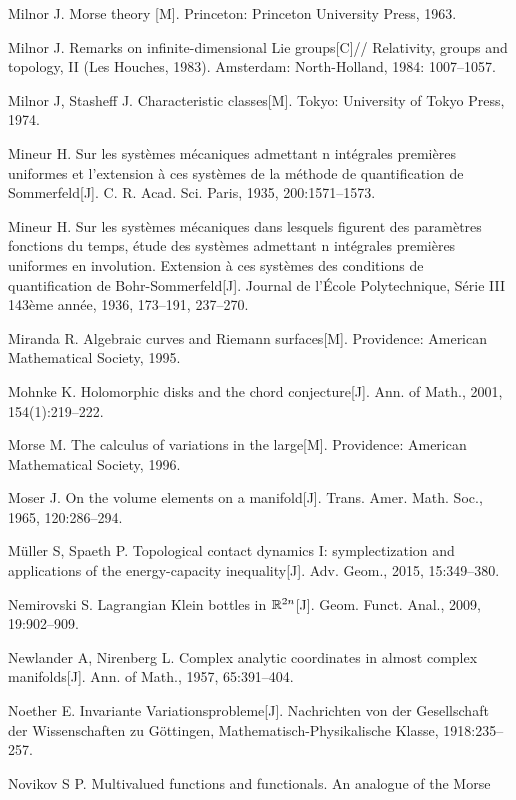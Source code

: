 \begin{enumerate}[label={[\arabic*]},leftmargin=3.2em,itemsep=2pt,parsep=0pt]
  \item Milnor J. Morse theory [M]. Princeton: Princeton University Press, 1963.
  \item Milnor J. Remarks on infinite-dimensional Lie groups[C]// Relativity, groups and
        topology, II (Les Houches, 1983). Amsterdam: North-Holland, 1984: 1007--1057.
  \item Milnor J, Stasheff J. Characteristic classes[M]. Tokyo: University of Tokyo Press,
        1974.
  \item Mineur H. Sur les systèmes mécaniques admettant n intégrales premières uniformes et
        l'extension à ces systèmes de la méthode de quantification de Sommerfeld[J].
        C. R. Acad. Sci. Paris, 1935, 200:1571--1573.
  \item Mineur H. Sur les systèmes mécaniques dans lesquels figurent des paramètres fonctions
        du temps, étude des systèmes admettant n intégrales premières uniformes en
        involution. Extension à ces systèmes des conditions de quantification de
        Bohr-Sommerfeld[J]. Journal de l'École Polytechnique, Série III 143ème année, 1936,
        173--191, 237--270.
  \item Miranda R. Algebraic curves and Riemann surfaces[M]. Providence: American
        Mathematical Society, 1995.
  \item Mohnke K. Holomorphic disks and the chord conjecture[J]. Ann. of Math., 2001,
        154(1):219--222.
  \item Morse M. The calculus of variations in the large[M]. Providence: American
        Mathematical Society, 1996.
  \item Moser J. On the volume elements on a manifold[J]. Trans. Amer. Math. Soc., 1965,
        120:286--294.
  \item Müller S, Spaeth P. Topological contact dynamics I: symplectization and applications
        of the energy-capacity inequality[J]. Adv. Geom., 2015, 15:349--380.
  \item Nemirovski S. Lagrangian Klein bottles in $\mathbb{R}^{2n}$[J]. Geom. Funct. Anal., 2009,
        19:902--909.
  \item Newlander A, Nirenberg L. Complex analytic coordinates in almost complex
        manifolds[J]. Ann. of Math., 1957, 65:391--404.
  \item Noether E. Invariante Variationsprobleme[J]. Nachrichten von der Gesellschaft der
        Wissenschaften zu Göttingen, Mathematisch-Physikalische Klasse, 1918:235--257.
  \item Novikov S P. Multivalued functions and functionals. An analogue of the Morse

\end{enumerate}
